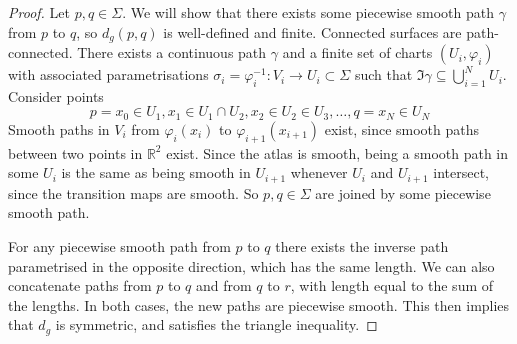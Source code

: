 \begin{proof}
	Let \( p, q \in \Sigma \).
	We will show that there exists some piecewise smooth path \( \gamma \) from \( p \) to \( q \), so \( d_g(p,q) \) is well-defined and finite.
	Connected surfaces are path-connected.
	There exists a continuous path \( \gamma \) and a finite set of charts \( (U_i, \varphi_i) \) with associated parametrisations \( \sigma_i = \varphi_i^{-1} \colon V_i \to U_i \subset \Sigma \) such that \( \Im \gamma \subseteq \bigcup_{i=1}^N U_i \).
	Consider points
	\[ p = x_0 \in U_1, x_1 \in U_1 \cap U_2, x_2 \in U_2 \in U_3, \dots, q = x_N \in U_N \]
	Smooth paths in \( V_i \) from \( \varphi_i(x_i) \) to \( \varphi_{i+1}(x_{i+1}) \) exist, since smooth paths between two points in \( \mathbb R^2 \) exist.
	Since the atlas is smooth, being a smooth path in some \( U_i \) is the same as being smooth in \( U_{i+1} \) whenever \( U_i \) and \( U_{i+1} \) intersect, since the transition maps are smooth.
	So \( p,q \in \Sigma \) are joined by some piecewise smooth path.

	For any piecewise smooth path from \( p \) to \( q \) there exists the inverse path parametrised in the opposite direction, which has the same length.
	We can also concatenate paths from \( p \) to \( q \) and from \( q \) to \( r \), with length equal to the sum of the lengths.
	In both cases, the new paths are piecewise smooth.
	This then implies that \( d_g \) is symmetric, and satisfies the triangle inequality.


\end{proof}
